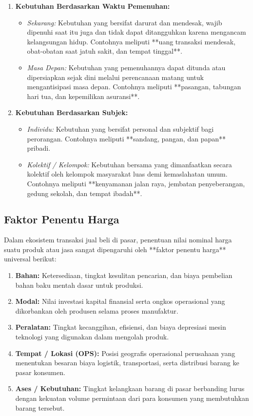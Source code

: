 \documentclass[12pt, a4paper]{article}
\begin{document}
\begin{enumerate}
    \item \textbf{Kebutuhan Berdasarkan Waktu Pemenuhan:}
    \begin{itemize}
        \item \textit{Sekarang:} Kebutuhan yang bersifat darurat dan mendesak, wajib dipenuhi saat itu juga dan tidak dapat ditangguhkan karena mengancam kelangsungan hidup. Contohnya meliputi **uang transaksi mendesak, obat-obatan saat jatuh sakit, dan tempat tinggal**.
        \item \textit{Masa Depan:} Kebutuhan yang pemenuhannya dapat ditunda atau dipersiapkan sejak dini melalui perencanaan matang untuk mengantisipasi masa depan. Contohnya meliputi **pasangan, tabungan hari tua, dan kepemilikan asuransi**.
    \end{itemize}

    \item \textbf{Kebutuhan Berdasarkan Subjek:}
    \begin{itemize}
        \item \textit{Individu:} Kebutuhan yang bersifat personal dan subjektif bagi perorangan. Contohnya meliputi **sandang, pangan, dan papan** pribadi.
        \item \textit{Kolektif / Kelompok:} Kebutuhan bersama yang dimanfaatkan secara kolektif oleh kelompok masyarakat luas demi kemaslahatan umum. Contohnya meliputi **kenyamanan jalan raya, jembatan penyeberangan, gedung sekolah, dan tempat ibadah**.
    \end{itemize}
\end{enumerate}

\subsection{Faktor Penentu Harga}
Dalam ekosistem transaksi jual beli di pasar, penentuan nilai nominal harga suatu produk atau jasa sangat dipengaruhi oleh **faktor penentu harga** universal berikut:
\begin{enumerate}
    \item \textbf{Bahan:} Ketersediaan, tingkat kesulitan pencarian, dan biaya pembelian bahan baku mentah dasar untuk produksi.
    \item \textbf{Modal:} Nilai investasi kapital finansial serta ongkos operasional yang dikorbankan oleh produsen selama proses manufaktur.
    \item \textbf{Peralatan:} Tingkat kecanggihan, efisiensi, dan biaya depresiasi mesin teknologi yang digunakan dalam mengolah produk.
    \item \textbf{Tempat / Lokasi (OPS):} Posisi geografis operasional perusahaan yang menentukan besaran biaya logistik, transportasi, serta distribusi barang ke pasar konsumen.
    \item \textbf{Ases / Kebutuhan:} Tingkat kelangkaan barang di pasar berbanding lurus dengan kekuatan volume permintaan dari para konsumen yang membutuhkan barang tersebut.
\end{enumerate}
\end{document}
